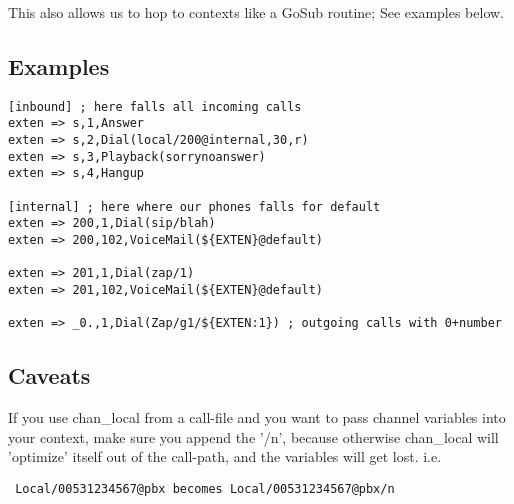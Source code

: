 This also allows us to hop to contexts like a GoSub routine; See examples below.

\subsection{Examples}

\begin{verbatim}
[inbound] ; here falls all incoming calls
exten => s,1,Answer
exten => s,2,Dial(local/200@internal,30,r)
exten => s,3,Playback(sorrynoanswer)
exten => s,4,Hangup

[internal] ; here where our phones falls for default
exten => 200,1,Dial(sip/blah)
exten => 200,102,VoiceMail(${EXTEN}@default)
  
exten => 201,1,Dial(zap/1)
exten => 201,102,VoiceMail(${EXTEN}@default)

exten => _0.,1,Dial(Zap/g1/${EXTEN:1}) ; outgoing calls with 0+number
\end{verbatim}

\subsection{Caveats}

If you use chan\_local from a call-file and you want to pass channel variables into your context, make sure you append the '/n', because otherwise chan\_local will 'optimize' itself out of the call-path, and the variables will get lost. i.e.

\begin{verbatim}
 Local/00531234567@pbx becomes Local/00531234567@pbx/n
\end{verbatim}
